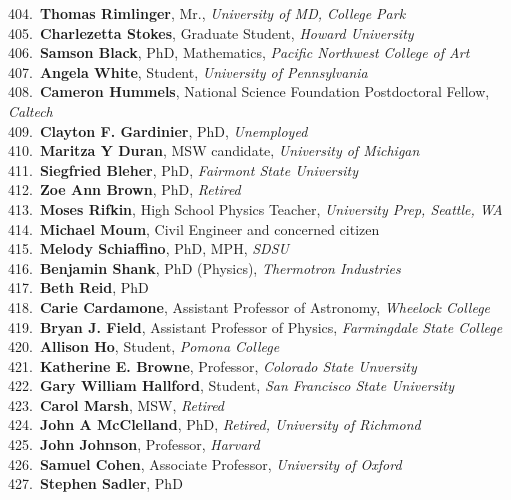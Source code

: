404.~{\bf Thomas Rimlinger}, Mr., {\sl University of MD, College Park} \\
405.~{\bf Charlezetta Stokes}, Graduate Student, {\sl Howard University} \\
406.~{\bf Samson Black}, PhD, Mathematics, {\sl Pacific Northwest College of Art} \\
407.~{\bf Angela White}, Student, {\sl University of Pennsylvania} \\
408.~{\bf Cameron Hummels}, National Science Foundation Postdoctoral Fellow, {\sl Caltech} \\
409.~{\bf Clayton F. Gardinier}, PhD, {\sl Unemployed} \\
410.~{\bf Maritza Y Duran}, MSW candidate, {\sl University of Michigan} \\
411.~{\bf Siegfried Bleher}, PhD, {\sl Fairmont State University} \\
412.~{\bf Zoe Ann Brown}, PhD, {\sl Retired} \\
413.~{\bf Moses Rifkin}, High School Physics Teacher, {\sl University Prep, Seattle, WA} \\
414.~{\bf Michael Moum}, Civil Engineer and concerned citizen \\
415.~{\bf Melody Schiaffino}, PhD, MPH, {\sl SDSU} \\
416.~{\bf Benjamin Shank}, PhD (Physics), {\sl Thermotron Industries} \\
417.~{\bf Beth Reid}, PhD \\
418.~{\bf Carie Cardamone}, Assistant Professor of Astronomy, {\sl Wheelock College} \\
419.~{\bf Bryan J. Field}, Assistant Professor of Physics, {\sl Farmingdale State College} \\
420.~{\bf Allison Ho}, Student, {\sl Pomona College} \\
421.~{\bf Katherine E. Browne}, Professor, {\sl Colorado State Unversity} \\
422.~{\bf Gary William Hallford}, Student, {\sl San Francisco State University } \\
423.~{\bf Carol Marsh}, MSW, {\sl Retired} \\
424.~{\bf John A McClelland}, PhD, {\sl Retired, University of Richmond} \\
425.~{\bf John Johnson}, Professor, {\sl Harvard} \\
426.~{\bf Samuel Cohen}, Associate Professor, {\sl University of Oxford} \\
427.~{\bf Stephen Sadler}, PhD \\

